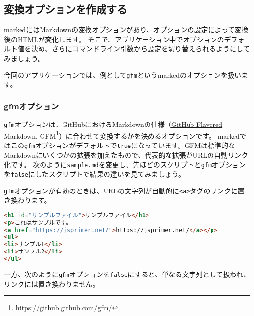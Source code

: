 

\hypertarget{create-convert-option}{%
\subsection{変換オプションを作成する}\label{create-convert-option}}

markedにはMarkdownの\href{https://marked.js.org/\#/USING_ADVANCED.md\#options}{変換オプション}があり、オプションの設定によって変換後のHTMLが変化します。
そこで、アプリケーション中でオプションのデフォルト値を決め、さらにコマンドライン引数から設定を切り替えられるようにしてみましょう。

今回のアプリケーションでは、例として\texttt{gfm}というmarkedのオプションを扱います。

\hypertarget{gfm-option}{%
\subsubsection{gfmオプション}\label{gfm-option}}

\texttt{gfm}オプションは、GitHubにおけるMarkdownの仕様（\href{https://github.github.com/gfm/}{GitHub
Flavored Markdown}, GFM\footnote{\url{https://github.github.com/gfm/}}）に合わせて変換するかを決めるオプションです。
markedではこの\texttt{gfm}オプションがデフォルトで\texttt{true}になっています。GFMは標準的なMarkdownにいくつかの拡張を加えたもので、代表的な拡張がURLの自動リンク化です。
次のように\texttt{sample.md}を変更し、先ほどのスクリプトと\texttt{gfm}オプションを\texttt{false}にしたスクリプトで結果の違いを見てみましょう。



\texttt{gfm}オプションが有効のときは、URLの文字列が自動的に\texttt{<a>}タグのリンクに置き換わります。

\begin{lstlisting}[language=HTML]
<h1 id="サンプルファイル">サンプルファイル</h1>
<p>これはサンプルです。
<a href="https://jsprimer.net/">https://jsprimer.net/</a></p>
<ul>
<li>サンプル1</li>
<li>サンプル2</li>
</ul>
\end{lstlisting}

一方、次のように\texttt{gfm}オプションを\texttt{false}にすると、単なる文字列として扱われ、リンクには置き換わりません。



